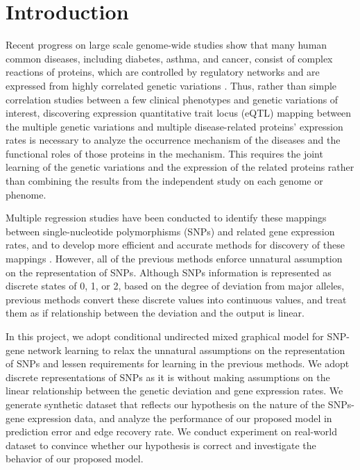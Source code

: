 \documentclass{article}
\begin{document}
\section{Introduction}
Recent progress on large scale genome-wide studies show that many human common diseases, including diabetes, asthma, and cancer, consist of complex reactions of proteins, which are controlled by regulatory networks and are expressed from highly correlated genetic variations \cite{basso2005reverse, chen2008variations}. Thus, rather than simple correlation studies between a few clinical phenotypes and genetic variations of interest, discovering expression quantitative trait locus (eQTL) mapping between the multiple genetic variations and multiple disease-related proteins' expression rates is necessary to analyze the occurrence mechanism of the diseases and the functional roles of those proteins in the mechanism. This requires the joint learning of the genetic variations and the expression of the related proteins rather than combining the results from the independent study on each genome or phenome. 

Multiple regression studies have been conducted to identify these mappings between single-nucleotide polymorphisms (SNPs) and related gene expression rates, and to develop more efficient and accurate methods for discovery of these mappings \cite{kim2010tree, sohn2012joint}. However, all of the previous methods enforce unnatural assumption on the representation of SNPs. Although SNPs information is represented as discrete states of 0, 1, or 2, based on the degree of deviation from major alleles, previous methods convert these discrete values into continuous values, and treat them as if relationship between the deviation and the output is linear.

In this project, we adopt conditional undirected mixed graphical model \cite{lee2013structure} for SNP-gene network learning to relax the unnatural assumptions on the representation of SNPs and lessen requirements for learning in the previous methods. We adopt discrete representations of SNPs as it is without making assumptions on the linear relationship between the genetic deviation and gene expression rates.
We generate synthetic dataset that reflects our hypothesis on the nature of the SNPs-gene expression data, and analyze the performance of our proposed model in prediction error and edge recovery rate. We conduct experiment on real-world dataset to convince whether our hypothesis is correct and investigate the behavior of our proposed model.
\end{document}
